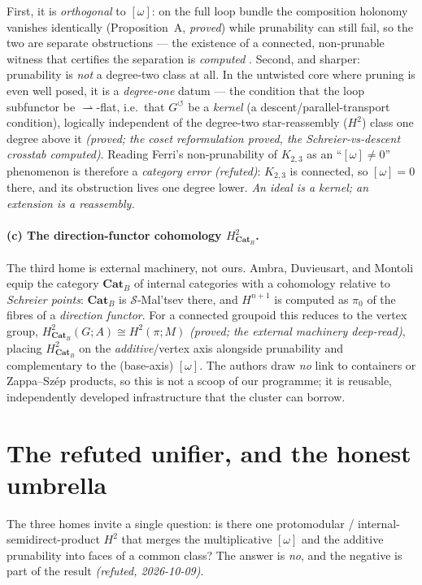 \documentclass[11pt]{report}
\theoremstyle{plain}
\theoremstyle{definition}
\theoremstyle{remark}
\newcommand{\Cat}{\mathbf{Cat}}
\newcommand{\Hcoh}{H^2}
\begin{document}
First, it is \emph{orthogonal} to $[\omega]$: on the full loop bundle the
composition holonomy vanishes identically (Proposition~A, \emph{proved}) while
prunability can still fail, so the two are separate obstructions --- the
existence of a connected, non-prunable witness that certifies the separation is
\emph{computed} \cite{cl-separation}. Second, and sharper: prunability is
\emph{not} a degree-two class at all. In the untwisted core where pruning is even
well posed, it is a \emph{degree-one} datum --- the condition that the loop
subfunctor be $\rightharpoonup$-flat, i.e.\ that $G^{\circlearrowleft}$ be a
\emph{kernel} (a descent/parallel-transport condition), logically independent of
the degree-two star-reassembly ($\Hcoh$) class one degree above it
\cite{cl-descent} \emph{(proved; the coset reformulation proved, the
Schreier-vs-descent crosstab computed)}. Reading Ferri's non-prunability of
$K_{2,3}$ as an ``$[\omega]\neq0$'' phenomenon is therefore a \emph{category
error} \emph{(refuted)}: $K_{2,3}$ is connected, so $[\omega]=0$ there, and its
obstruction lives one degree lower. \emph{An ideal is a kernel; an extension is a
reassembly.}

\paragraph{(c) The direction-functor cohomology $\Hcoh_{\Cat_B}$.} The third home
is external machinery, not ours. Ambra, Duvieusart, and Montoli
\cite{adm-catb} equip the category $\Cat_B$ of internal categories with a
cohomology relative to \emph{Schreier points}: $\Cat_B$ is
$\mathcal S$-Mal'tsev there, and $H^{n+1}$ is computed as $\pi_0$ of the fibres of
a \emph{direction functor}. For a connected groupoid this reduces to the vertex
group, $\Hcoh_{\Cat_B}(G;A)\cong\Hcoh(\pi;M)$ \emph{(proved; the external
machinery deep-read)}, placing $\Hcoh_{\Cat_B}$ on the \emph{additive}/vertex axis
alongside prunability and complementary to the (base-axis) $[\omega]$. The
authors draw \emph{no} link to containers or Zappa--Sz\'ep products, so this is
not a scoop of our programme; it is reusable, independently developed
infrastructure that the cluster can borrow.

\section{The refuted unifier, and the honest umbrella}\label{sec:cluster-unifier}

The three homes invite a single question: is there one protomodular /
internal-semidirect-product $\Hcoh$ that merges the multiplicative $[\omega]$ and
the additive prunability into faces of a common class? The answer is \emph{no},
and the negative is part of the result \emph{(refuted, 2026-10-09)}.
\end{document}
